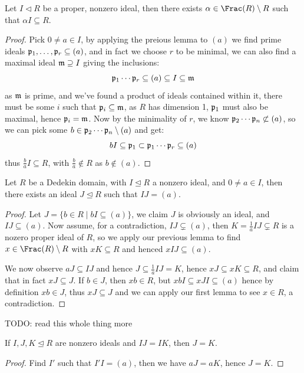 \documentclass{article}
\begin{document}
\begin{lemma}
    Let $I\lhd R$ be a proper, nonzero ideal, then there exists $\alpha\in \Frac(R)\setminus R$ such that $\alpha I \subseteq R$.
    \begin{proof}
        Pick $0\neq a\in I$, by applying the preious lemma to $(a)$ we find prime ideals $\mathfrak{p}_1,\ldots,\mathfrak{p}_r\subseteq (a)$, and in fact we choose $r$ to be minimal, we can also find a maximal ideal $\mathfrak{m}\supseteq I$ giving the inclusions: \[
        \mathfrak{p}_1\cdots\mathfrak{p}_r \subseteq (a) \subseteq I \subseteq \mathfrak{m}
        \] as $\mathfrak{m}$ is prime, and we've found a product of ideals contained within it, there must be some $i$ such that $\mathfrak{p}_i\subseteq \mathfrak{m}$, as $R$ has dimension 1, $\mathfrak{p}_1$ must also be maximal, hence $\mathfrak{p}_i=\mathfrak{m}$. Now by the minimality of $r$, we know $\mathfrak{p}_2\cdots\mathfrak{p}_n\not\subset (a)$, so we can pick some $b\in\mathfrak{p}_2\cdots\mathfrak{p}_n\setminus(a)$ and get: \[
        bI \subseteq \mathfrak{p}_1\subset \mathfrak{p}_1\cdots\mathfrak{p}_r\subseteq (a)
        \] thus $\frac{b}{a}I\subseteq R$, with $\frac{b}{a}\not\in R$ as $b\not\in (a)$.
    \end{proof}
\end{lemma}

\begin{proposition}
    Let $R$ be a Dedekin domain, with $I\unlhd R$ a nonzero ideal, and $0\neq a\in I$, then there exists an ideal $J\unlhd R$ such that $IJ=(a)$.
    \begin{proof}
        Let $J= \{b\in R \mid bI\subseteq (a)\}$, we claim $J$ is obviously an ideal, and $IJ\subseteq (a)$. Now assume, for a contradiction, $IJ\subsetneq (a)$, then $K=\frac{1}{a}IJ\subsetneq R$ is a nozero proper ideal of $R$, so we apply our previous lemma to find $x\in\Frac(R)\setminus R$ with $xK\subseteq R$ and henced $xIJ\subseteq (a)$.

        We now observe $aJ\subseteq IJ$ and hence $J\subseteq \frac{1}{a}IJ=K$, hence $xJ\subseteq xK \subseteq R$, and claim that in fact $xJ\subseteq J$. If $b\in J$, then $xb\in R$, but $xbI\subseteq xJI \subseteq (a)$ hence by definition $xb\in J$, thus $xJ\subseteq J$ and we can apply our first lemma to see $x\in R$, a contradiction.
    \end{proof}
\end{proposition}

TODO: read this whole thing more

\begin{corollary}
    If $I,J,K\unlhd R$ are nonzero ideals and $IJ=IK$, then $J=K$.\begin{proof}
        Find $I'$ such that $I'I=(a)$, then we have $aJ=aK$, hence $J=K$.
    \end{proof}
\end{corollary}
\end{document}
